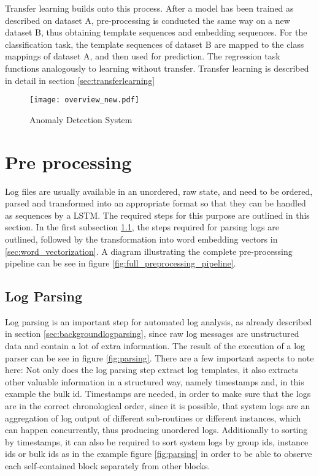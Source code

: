 Transfer learning builds onto this process. After a model has been trained as described on dataset A, pre-processing is conducted the same way on a new dataset B, thus obtaining template sequences and embedding sequences. For the classification task, the template sequences of dataset B are mapped to the class mappings of dataset A, and then used for prediction. The regression task functions analogously to learning without transfer. Transfer learning is described in detail in section \ref{sec:transferlearning}

\begin{figure}[H]
	\centering
	\texttt{[image: overview\_new.pdf]}
	\caption{Anomaly Detection System}
	\label{fig:overall_system}
\end{figure}

\section{Pre processing \label{sec:pre_processing}}
Log files are usually available in an unordered, raw state, and need to be ordered, parsed and transformed into an appropriate format so that they can be handled as sequences by a LSTM. The required steps for this purpose are outlined in this section. In the first subsection \ref{sec:conceptlogparsing}, the steps required for parsing logs are outlined, followed by the transformation into word embedding vectors in \ref{sec:word_vectorization}. A diagram illustrating the complete pre-processing pipeline can be see in figure \ref{fig:full_preprocessing_pipeline}.

\subsection{Log Parsing}\label{sec:conceptlogparsing}
Log parsing is an important step for automated log analysis, as already described in section \ref{sec:backgroundlogparsing}, since raw log messages are unstructured data and contain a lot of extra information. The result of the execution of a log parser can be see in figure \ref{fig:parsing}. There are a few important aspects to note here: Not only does the log parsing step extract log templates, it also extracts other valuable information in a structured way, namely timestamps and, in this example the bulk id. Timestamps are needed, in order to make sure that the logs are in the correct chronological order, since it is possible, that system logs are an aggregation of log output of different sub-routines or different instances, which can happen concurrently, thus producing unordered logs. Additionally to sorting by timestamps, it can also be required to sort system logs by group ids, instance ids or bulk ids as in the example figure \ref{fig:parsing} in order to be able to observe each self-contained block separately from other blocks.

